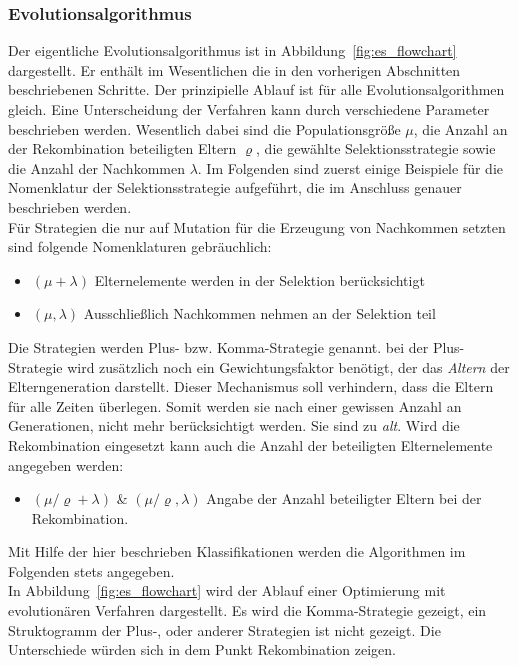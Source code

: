 \subsubsection{Evolutionsalgorithmus}
%
Der eigentliche Evolutionsalgorithmus ist in Abbildung~\ref{fig:es_flowchart} dargestellt. Er enthält im Wesentlichen die in den vorherigen Abschnitten beschriebenen Schritte. Der prinzipielle Ablauf ist für alle Evolutionsalgorithmen gleich. Eine Unterscheidung der Verfahren kann durch verschiedene Parameter beschrieben werden. Wesentlich dabei sind die Populationsgröße $\mu$, die Anzahl an der Rekombination beteiligten Eltern $\varrho$, die gewählte Selektionsstrategie sowie die Anzahl der Nachkommen $\lambda$. Im Folgenden sind zuerst einige Beispiele für die Nomenklatur der Selektionsstrategie aufgeführt, die im Anschluss genauer beschrieben werden.\\
Für Strategien die nur auf Mutation für die Erzeugung von Nachkommen setzten sind folgende Nomenklaturen gebräuchlich:
\begin{itemize}
\item $(\mu+\lambda)$ Elternelemente werden in der Selektion berücksichtigt
\item $(\mu,\lambda)$ Ausschließlich Nachkommen nehmen an der Selektion teil
\end{itemize}
%
Die Strategien werden Plus- bzw. Komma-Strategie genannt. bei der Plus-Strategie wird zusätzlich noch ein Gewichtungsfaktor benötigt, der das \textit{Altern} der Elterngeneration darstellt. Dieser Mechanismus soll verhindern, dass die Eltern für alle Zeiten überlegen. Somit werden sie nach einer gewissen Anzahl an Generationen, nicht mehr berücksichtigt werden. Sie sind zu \textit{alt}. Wird die Rekombination eingesetzt kann auch die Anzahl der beteiligten Elternelemente angegeben werden:
%
\begin{itemize}
\item $({\mu}/{\varrho}+\lambda)$ \& $({\mu}/{\varrho},\lambda)$ Angabe der Anzahl beteiligter Eltern bei der Rekombination.
\end{itemize}
%
Mit Hilfe der hier beschrieben Klassifikationen werden die Algorithmen im Folgenden stets angegeben.\\
%
In Abbildung~\ref{fig:es_flowchart} wird der Ablauf einer Optimierung mit evolutionären Verfahren dargestellt. Es wird die Komma-Strategie gezeigt, ein Struktogramm der Plus-, oder anderer Strategien ist nicht gezeigt. Die Unterschiede würden sich in dem Punkt Rekombination zeigen.
%
